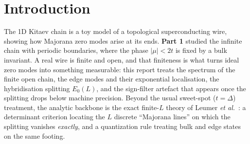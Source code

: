 
\section{Introduction}
\label{sec:intro}

The 1D Kitaev chain is a toy model of a topological superconducting wire,
showing how Majorana zero modes arise at its ends. \textbf{Part 1} studied the
infinite chain with periodic boundaries, where the phase $|\mu| < 2t$ is fixed
by a bulk invariant. A real wire is finite and open, and that finiteness is
what turns ideal zero modes into something measurable: this report treats the
spectrum of the finite open chain, the edge modes and their exponential
localisation, the hybridisation splitting $E_0(L)$, and the sign-filter
artefact that appears once the splitting drops below machine precision. Beyond
the usual sweet-spot ($t = \Delta$) treatment, the analytic backbone is the
exact finite-$L$ theory of Leumer \emph{et
al.}~\cite{leumer2020,leumer2021thesis}: a determinant criterion locating the
$L$ discrete ``Majorana lines'' on which the splitting vanishes \emph{exactly},
and a quantization rule treating bulk and edge states on the same footing.

